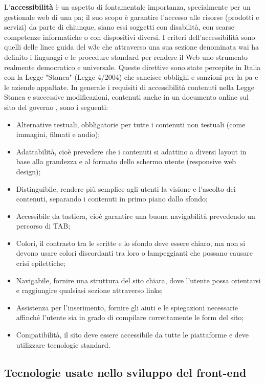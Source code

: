 L'\textbf{accessibilità} è un aspetto di fontamentale importanza, specialmente per un gestionale web di una \Gls{pa}; il suo scopo è garantire l'accesso alle risorse (prodotti e servizi) da parte di chiunque, siano essi soggetti con disabilità, con scarse competenze informatiche o con dispositivi diversi.
I criteri dell'accessibilità sono quelli delle linee guida del \Gls{w3c} che attraverso una sua sezione denominata \Gls{wai} \cite{w3c-wai} ha definito i linguaggi e le procedure standard per rendere il Web uno strumento realmente democratico e universale.
Queste direttive sono state percepite in Italia con la Legge "Stanca" (Legge 4/2004) che sancisce obblighi e sanzioni per la \Gls{pa} e le aziende appaltate.
In generale i requisiti di accessibilità contenuti nella Legge Stanca e successive modificazioni, contenuti anche in un documento online sul sito del governo \cite{agid-access}, sono i seguenti:
\begin{itemize}
    \item Alternative testuali, obbligatorie per tutte i contenuti non testuali (come immagini, filmati e audio);
    \item Adattabilità, cioè prevedere che i contenuti si adattino a diversi layout in base alla grandezza e al formato dello schermo utente (responsive web design);
    \item Distinguibile, rendere più semplice agli utenti la visione e l'ascolto dei contenuti, separando i contenuti in primo piano dallo sfondo;
    \item Accessibile da tastiera, cioè garantire una buona navigabilità prevedendo un percorso di TAB;
    \item Colori, il contrasto tra le scritte e lo sfondo deve essere chiaro, ma non si devono usare colori discordanti tra loro o lampeggianti che possano causare crisi epilettiche;
    \item Navigabile, fornire una struttura del sito chiara, dove l'utente possa orientarsi e raggiungire qualsiasi sezione attraverso links;
    \item Assistenza per l'inserimento, fornire gli aiuti e le spiegazioni necessarie affinché l'utente sia in grado di compilare correttamente le form del sito;
    \item Compatibilità, il sito deve essere accessibile da tutte le piattaforme e deve utilizzare tecnologie standard.
\end{itemize}


\subsection{Tecnologie usate nello sviluppo del front-end}

